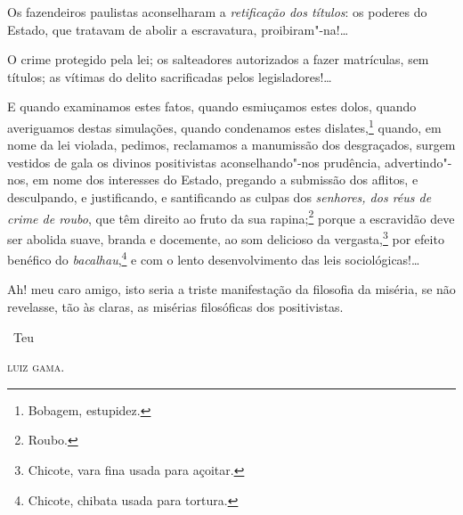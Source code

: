 Os fazendeiros paulistas aconselharam a \emph{retificação dos títulos}:
os poderes do Estado, que tratavam de abolir a escravatura,
proibiram"-na!\ldots{}

O crime protegido pela lei; os salteadores autorizados a fazer
matrículas, sem títulos; as vítimas do delito sacrificadas pelos
legisladores!\ldots{}

E quando examinamos estes fatos, quando esmiuçamos estes dolos, quando
averiguamos destas simulações, quando condenamos estes
dislates,\footnote{Bobagem, estupidez.} quando, em nome da lei
violada, pedimos, reclamamos a manumissão dos desgraçados, surgem
vestidos de gala os divinos positivistas aconselhando"-nos prudência,
advertindo"-nos, em nome dos interesses do Estado, pregando a submissão
dos aflitos, e desculpando, e justificando, e santificando as culpas dos
\emph{senhores, dos réus de crime de roubo}, que têm direito ao fruto da
sua rapina;\footnote{Roubo.} porque a escravidão deve ser abolida
suave, branda e docemente, ao som delicioso da vergasta,\footnote{
  Chicote, vara fina usada para açoitar.} por efeito benéfico do
\emph{bacalhau},\footnote{Chicote, chibata usada para tortura.}
e com o lento
desenvolvimento das leis sociológicas!\ldots{}

Ah! meu caro amigo, isto seria a triste manifestação da filosofia da
miséria, se não revelasse, tão às claras, as misérias filosóficas dos
positivistas.

\bigskip

\hfill\ Teu

\hfill\textsc{luiz gama}.

\paginabranca
\mbox{}\vfill
\thispagestyle{empty}

